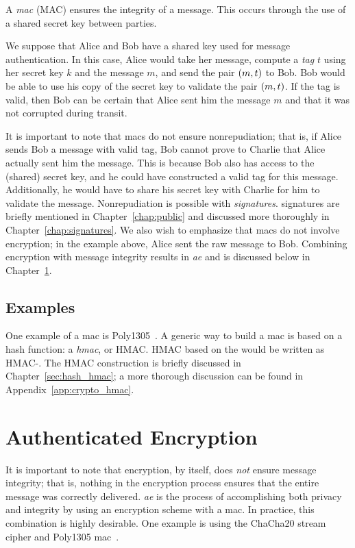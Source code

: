 A \emph{\gls{mac}} (MAC) ensures the integrity
of a message.
This occurs through the use of a shared secret key between parties.

We suppose that Alice and Bob have a shared key used for
message authentication.
In this case, Alice would take her message,
compute a \emph{tag} $t$ using her secret key $k$ and the message $m$,
and send the pair $\left( m,t \right)$ to Bob.
Bob would be able to use his copy of the secret key to validate
the pair $\left( m,t \right)$.
If the tag is valid, then Bob can be certain that Alice sent him
the message $m$ and that it was not corrupted during transit.

It is important to note that \glspl{mac} do not ensure nonrepudiation;
that is, if Alice sends Bob a message with valid tag,
Bob cannot prove to Charlie that Alice actually sent him the message.
This is because Bob also has access to the (shared) secret key,
and he could have constructed a valid tag for this message.
Additionally, he would have to share his secret key with Charlie
for him to validate the message.
Nonrepudiation is possible with \emph{\glspl{signature}}.
\Glspl{signature} are briefly mentioned in Chapter~\ref{chap:public}
and discussed more thoroughly in Chapter~\ref{chap:signatures}.
We also wish to emphasize that \glspl{mac} do not involve encryption;
in the example above, Alice sent the raw message to Bob.
Combining encryption with message integrity results in
\emph{\gls{ae}} and is discussed
below in Chapter~\ref{sec:symmetric_ae}.

\subsection{Examples}

One example of a \gls{mac} is Poly1305~\cite{poly1305}.
A generic way to build a \gls{mac} is based on a \gls{hash function}:
a \emph{\gls{hmac}}, or HMAC.
HMAC based on the \ShaTwo{} 
would be written as HMAC-\ShaTwo{}.
The HMAC construction is briefly discussed in Chapter~\ref{sec:hash_hmac};
a more thorough discussion can be found in Appendix~\ref{app:crypto_hmac}.



\section{Authenticated Encryption}
\label{sec:symmetric_ae}

It is important to note that encryption, by itself,
does \emph{not} ensure message integrity;
that is, nothing in the encryption process ensures that
the entire message was correctly delivered.
\emph{\Gls{ae}} is the process of
accomplishing both privacy and integrity
by using an \gls{encryption scheme} with a \gls{mac}.
In practice, this combination is highly desirable.
One example is using the ChaCha20 \gls{stream cipher} and
Poly1305 \gls{mac}~\cite{rfc8439,cryptoeprint:2014:613}.
